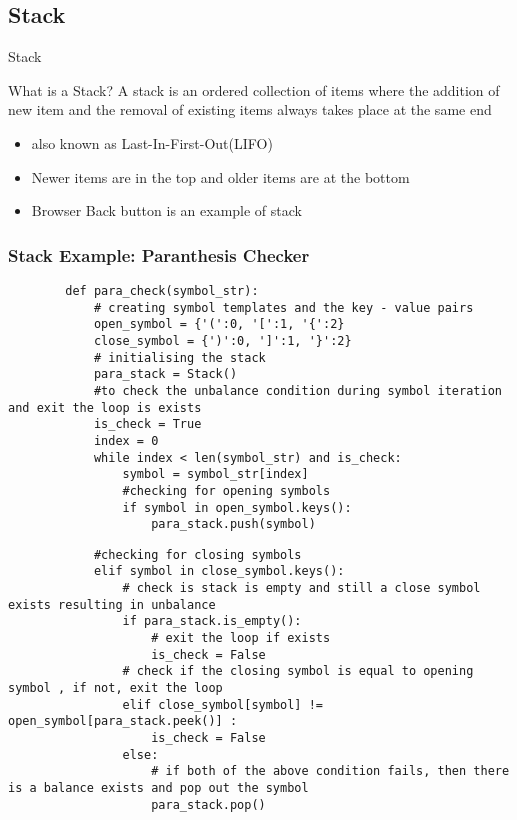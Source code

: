 \documentclass{beamer}
\begin{document}
\subsection{Stack}
\begin{frame}{Stack}
    \begin{alertblock}{What is a Stack?}
        A \alert{stack} is an ordered collection of items where the addition of new item and the removal of existing items always takes place at the same end 
    \end{alertblock}
    \begin{itemize}
        \item also known as \alert{Last-In-First-Out(LIFO)}
        \item Newer items are in the top and older items are at the bottom
        \item Browser \alert{Back} button is an example of stack
    \end{itemize}
\end{frame}
\begin{frame}[fragile]
    \frametitle{Stack Example: Paranthesis Checker}
    \begin{lstlisting}
        def para_check(symbol_str):
            # creating symbol templates and the key - value pairs
            open_symbol = {'(':0, '[':1, '{':2}
            close_symbol = {')':0, ']':1, '}':2}
            # initialising the stack
            para_stack = Stack()
            #to check the unbalance condition during symbol iteration and exit the loop is exists 
            is_check = True
            index = 0
            while index < len(symbol_str) and is_check:
                symbol = symbol_str[index]
                #checking for opening symbols
                if symbol in open_symbol.keys():
                    para_stack.push(symbol)
    \end{lstlisting}
\end{frame}

\begin{frame}[fragile]    
    \begin{lstlisting}
            #checking for closing symbols
            elif symbol in close_symbol.keys():
                # check is stack is empty and still a close symbol exists resulting in unbalance
                if para_stack.is_empty():
                    # exit the loop if exists
                    is_check = False
                # check if the closing symbol is equal to opening symbol , if not, exit the loop
                elif close_symbol[symbol] != open_symbol[para_stack.peek()] :
                    is_check = False 
                else:
                    # if both of the above condition fails, then there is a balance exists and pop out the symbol
                    para_stack.pop()
    \end{lstlisting}
\end{frame}
    
\end{document}
